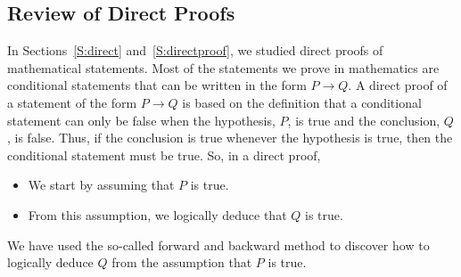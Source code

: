\subsection*{Review of Direct Proofs}
In Sections~\ref{S:direct} and~\ref{S:directproof}, we studied direct proofs
%
%
 of mathematical statements.  Most of the statements we prove in mathematics are conditional statements that can be written in the form   $P \to Q$.  A direct proof of a statement of the form  $P \to Q$ is based on the definition that a conditional statement can only be false when the hypothesis,  $P$,  is true and the conclusion,  $Q$,  is false.  Thus, if the conclusion is true whenever the hypothesis is true, then the conditional statement must be true.  So, in a direct proof,
\begin{itemize}
  \item We start by assuming that  $P$  is true.
  \item From this assumption, we logically deduce that  $Q$  is true.
\end{itemize}
We have used the so-called forward and backward method to discover how to logically deduce  $Q$  from  the assumption that  $P$  is true.

\endinput
